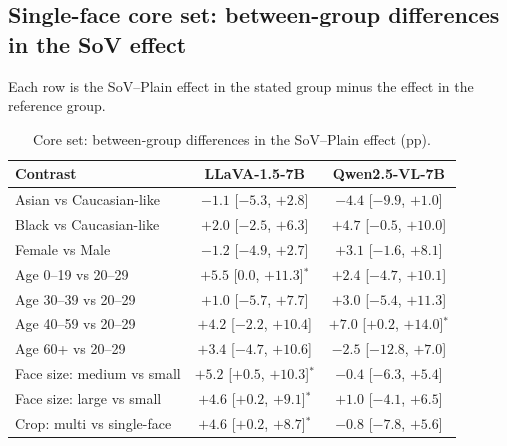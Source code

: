 \documentclass[lettersize,journal]{IEEEtran}
\begin{document}
\subsection{Single-face core set: between-group differences in the SoV effect}
Each row is the SoV--Plain effect in the stated group minus the effect in the reference group.
\begin{table}[!t]
\caption{Core set: between-group differences in the SoV--Plain effect (pp).}
\label{tab:app_groups_diff}
\centering
\scriptsize
\setlength{\tabcolsep}{3pt}
\begin{tabular}{lcc}
\toprule
Contrast & LLaVA-1.5-7B & Qwen2.5-VL-7B \\
\midrule
Asian vs Caucasian-like & $-1.1$ [$-5.3$, $+2.8$] & $-4.4$ [$-9.9$, $+1.0$] \\
Black vs Caucasian-like & $+2.0$ [$-2.5$, $+6.3$] & $+4.7$ [$-0.5$, $+10.0$] \\
Female vs Male & $-1.2$ [$-4.9$, $+2.7$] & $+3.1$ [$-1.6$, $+8.1$] \\
\midrule
Age 0--19 vs 20--29 & $+5.5$ [$0.0$, $+11.3$]$^{*}$ & $+2.4$ [$-4.7$, $+10.1$] \\
Age 30--39 vs 20--29 & $+1.0$ [$-5.7$, $+7.7$] & $+3.0$ [$-5.4$, $+11.3$] \\
Age 40--59 vs 20--29 & $+4.2$ [$-2.2$, $+10.4$] & $+7.0$ [$+0.2$, $+14.0$]$^{*}$ \\
Age 60+ vs 20--29 & $+3.4$ [$-4.7$, $+10.6$] & $-2.5$ [$-12.8$, $+7.0$] \\
\midrule
Face size: medium vs small & $+5.2$ [$+0.5$, $+10.3$]$^{*}$ & $-0.4$ [$-6.3$, $+5.4$] \\
Face size: large vs small & $+4.6$ [$+0.2$, $+9.1$]$^{*}$ & $+1.0$ [$-4.1$, $+6.5$] \\
Crop: multi vs single-face & $+4.6$ [$+0.2$, $+8.7$]$^{*}$ & $-0.8$ [$-7.8$, $+5.6$] \\
\bottomrule
\end{tabular}
\end{table}
\end{document}
